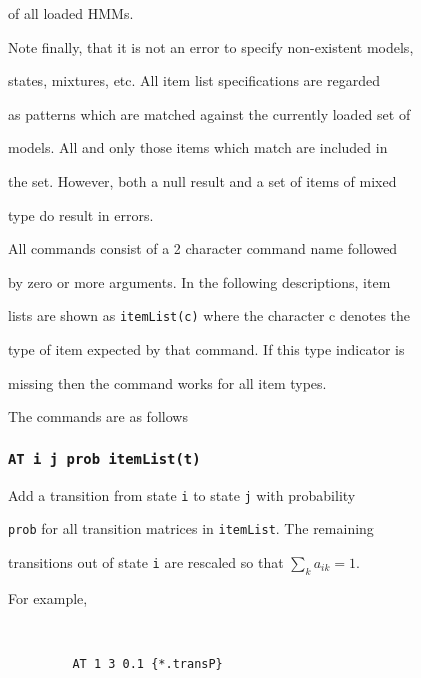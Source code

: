 of all loaded HMMs.





Note finally, that it is not an error to specify non-existent models,


states, mixtures, etc.  All item list specifications are regarded


as patterns which are matched against the currently loaded set of


models.  All and only those items which match are included in


the set.  However, both a null result and a set of items of mixed


type do result in errors.





All  commands consist of a 2 character command name followed


by zero or more arguments.  In the following descriptions, item


lists are shown as \texttt{itemList(c)} where the character c denotes the


type of item expected by that command.  If this type indicator is


missing then the command works for all item types.





The  commands are as follows





\subsubsection{\texttt{AT i j prob itemList(t)}}





Add a transition from state \texttt{i} to state \texttt{j} with probability


\texttt{prob} for all transition matrices in \texttt{itemList}.  The remaining


transitions out of state \texttt{i} are rescaled so that $\sum_k a_{ik} = 1 $.


For example,


\begin{verbatim}


         AT 1 3 0.1 {*.transP}


\end{verbatim}


